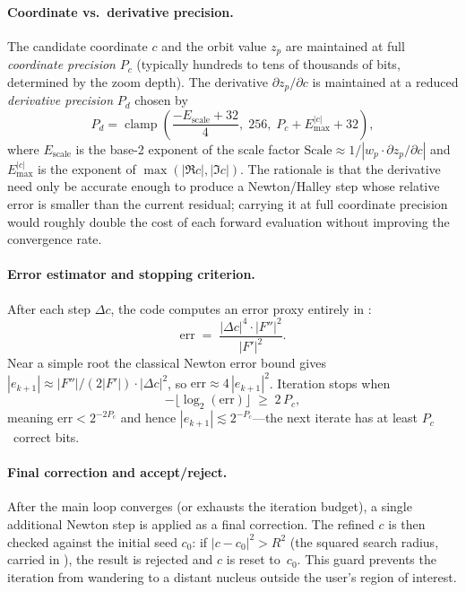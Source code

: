 \paragraph{Coordinate vs.\ derivative precision.}
The candidate coordinate $c$ and the orbit value $z_p$ are maintained at full
\emph{coordinate precision} $P_c$ (typically hundreds to tens of thousands of
bits, determined by the zoom depth).  The derivative
$\partial z_p/\partial c$ is maintained at a reduced \emph{derivative
precision} $P_d$ chosen by
\begin{equation}\label{eq:ff-deriv-prec}
P_d = \operatorname{clamp}\!\left(
  \frac{-E_{\mathrm{scale}} + 32}{4},\;
  256,\;
  P_c + E_{\max}^{|c|} + 32
\right),
\end{equation}
where $E_{\mathrm{scale}}$ is the base-2 exponent of the scale factor
$\text{Scale} \approx 1/|w_p \cdot \partial z_p/\partial c|$ and
$E_{\max}^{|c|}$ is the exponent of $\max(|\Re c|,|\Im c|)$.
The rationale is that the derivative need only be accurate enough to produce
a Newton/Halley step whose relative error is smaller than the current
residual; carrying it at full coordinate precision would roughly double the
cost of each forward evaluation without improving the convergence rate.

\paragraph{Error estimator and stopping criterion.}
After each step $\Delta c$, the code computes an error proxy entirely in
:
\begin{equation}\label{eq:ff-err}
\mathrm{err} \;=\;
  \frac{|\Delta c|^4 \cdot |F''|^2}{|F'|^2}.
\end{equation}
Near a simple root the classical Newton error bound gives
$|e_{k+1}| \approx |F''|/(2|F'|) \cdot |\Delta c|^2$,
so $\mathrm{err} \approx 4\,|e_{k+1}|^2$.
Iteration stops when
\begin{equation}\label{eq:ff-stop}
-\lfloor \log_2(\mathrm{err}) \rfloor \;\ge\; 2\,P_c,
\end{equation}
meaning $\mathrm{err} < 2^{-2P_c}$ and hence
$|e_{k+1}| \lesssim 2^{-P_c}$---the next iterate has at least $P_c$~correct
bits.

\paragraph{Final correction and accept/reject.}
After the main loop converges (or exhausts the iteration budget), a single
additional Newton step is applied as a final correction.  The refined $c$ is
then checked against the initial seed $c_0$: if
$|c - c_0|^2 > R^2$ (the squared search radius, carried in ),
the result is rejected and $c$ is reset to~$c_0$.  This guard prevents the
iteration from wandering to a distant nucleus outside the user's region of
interest.

